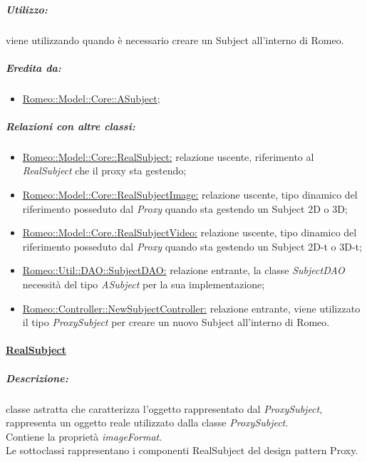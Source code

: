 			\subparagraph{Utilizzo:} viene utilizzando quando è necessario creare un Subject\g{} all'interno di Romeo\g{}.
			
			\subparagraph{Eredita da:}
			\begin{itemize}
				\item \hyperref[core_asub]{Romeo::Model::Core::ASubject};
			\end{itemize}
			
			\subparagraph{Relazioni con altre classi:}
				\begin{itemize}
					\item \hyperref[realsubject]{Romeo::Model::Core::RealSubject:} relazione uscente, riferimento al \textsl{RealSubject} che il proxy sta gestendo;
					
					\item \hyperref[]{Romeo::Model::Core::RealSubjectImage:} relazione uscente, tipo dinamico del riferimento posseduto dal \emph{Proxy} quando sta gestendo un Subject\g{} 2D o 3D;
									
					\item \hyperref[]{Romeo::Model::Core.:RealSubjectVideo:} relazione uscente, tipo dinamico del riferimento posseduto dal \emph{Proxy} quando sta gestendo un Subject\g{} 2D-t o 3D-t; 
					
					\item \hyperref[]{Romeo::Util::DAO::SubjectDAO:} relazione entrante, la classe \textsl{SubjectDAO} necessità del tipo \textsl{ASubject} per la sua implementazione;
					
					\item \hyperref[]{Romeo::Controller::NewSubjectController:} relazione entrante, viene utilizzato il tipo \textsl{ProxySubject} per creare un nuovo Subject\g{} all'interno di Romeo\g{}.
					
				\end{itemize}
			
	\paragraph{\underline{RealSubject}}  
	\label{realsubject}
		
		\subparagraph{Descrizione:} classe astratta che caratterizza l’oggetto rappresentato dal \textsl{ProxySubject}, rappresenta un oggetto reale utilizzato dalla classe \textsl{ProxySubject}.
		\\Contiene la proprietà \emph{imageFormat}.
		\\Le sottoclassi rappresentano i componenti RealSubject del design pattern\g{} Proxy.
		
